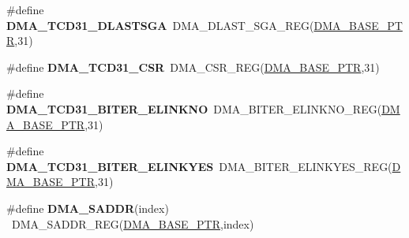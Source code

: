 \begin{DoxyCompactItemize}
\item 
\hypertarget{group___d_m_a___register___accessor___macros_ga3f3d143d7d6a6eb73e1bff53e8f06e40}{}\#define {\bfseries D\+M\+A\+\_\+\+T\+C\+D31\+\_\+\+D\+L\+A\+S\+T\+S\+G\+A}~D\+M\+A\+\_\+\+D\+L\+A\+S\+T\+\_\+\+S\+G\+A\+\_\+\+R\+E\+G(\hyperlink{group___d_m_a___peripheral_ga6997fbc1b1973e9f27170217a3bd6f22}{D\+M\+A\+\_\+\+B\+A\+S\+E\+\_\+\+P\+T\+R},31)\label{group___d_m_a___register___accessor___macros_ga3f3d143d7d6a6eb73e1bff53e8f06e40}

\item 
\hypertarget{group___d_m_a___register___accessor___macros_gadab87c023a644f9f450224f5aa3b82c9}{}\#define {\bfseries D\+M\+A\+\_\+\+T\+C\+D31\+\_\+\+C\+S\+R}~D\+M\+A\+\_\+\+C\+S\+R\+\_\+\+R\+E\+G(\hyperlink{group___d_m_a___peripheral_ga6997fbc1b1973e9f27170217a3bd6f22}{D\+M\+A\+\_\+\+B\+A\+S\+E\+\_\+\+P\+T\+R},31)\label{group___d_m_a___register___accessor___macros_gadab87c023a644f9f450224f5aa3b82c9}

\item 
\hypertarget{group___d_m_a___register___accessor___macros_ga5e0f446511c5d41c1616ef22b63a63a0}{}\#define {\bfseries D\+M\+A\+\_\+\+T\+C\+D31\+\_\+\+B\+I\+T\+E\+R\+\_\+\+E\+L\+I\+N\+K\+N\+O}~D\+M\+A\+\_\+\+B\+I\+T\+E\+R\+\_\+\+E\+L\+I\+N\+K\+N\+O\+\_\+\+R\+E\+G(\hyperlink{group___d_m_a___peripheral_ga6997fbc1b1973e9f27170217a3bd6f22}{D\+M\+A\+\_\+\+B\+A\+S\+E\+\_\+\+P\+T\+R},31)\label{group___d_m_a___register___accessor___macros_ga5e0f446511c5d41c1616ef22b63a63a0}

\item 
\hypertarget{group___d_m_a___register___accessor___macros_ga757f7461c41ff74e6e3639297329f574}{}\#define {\bfseries D\+M\+A\+\_\+\+T\+C\+D31\+\_\+\+B\+I\+T\+E\+R\+\_\+\+E\+L\+I\+N\+K\+Y\+E\+S}~D\+M\+A\+\_\+\+B\+I\+T\+E\+R\+\_\+\+E\+L\+I\+N\+K\+Y\+E\+S\+\_\+\+R\+E\+G(\hyperlink{group___d_m_a___peripheral_ga6997fbc1b1973e9f27170217a3bd6f22}{D\+M\+A\+\_\+\+B\+A\+S\+E\+\_\+\+P\+T\+R},31)\label{group___d_m_a___register___accessor___macros_ga757f7461c41ff74e6e3639297329f574}

\item 
\hypertarget{group___d_m_a___register___accessor___macros_gacfcb1ae8a0d8213caa2e118a357e9308}{}\#define {\bfseries D\+M\+A\+\_\+\+S\+A\+D\+D\+R}(index)                                              ~D\+M\+A\+\_\+\+S\+A\+D\+D\+R\+\_\+\+R\+E\+G(\hyperlink{group___d_m_a___peripheral_ga6997fbc1b1973e9f27170217a3bd6f22}{D\+M\+A\+\_\+\+B\+A\+S\+E\+\_\+\+P\+T\+R},index)\label{group___d_m_a___register___accessor___macros_gacfcb1ae8a0d8213caa2e118a357e9308}


\end{DoxyCompactItemize}
